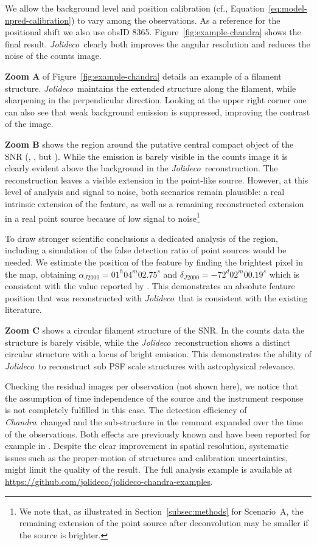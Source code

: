 \documentclass[twocolumn, linenumbers]{aastex631}
\newcommand{\chandra}{\textit{Chandra}~}
\newcommand{\jolideco}{\textit{Jolideco}~}
\begin{document}
    We allow the background level and position calibration (cf., Equation~\ref{eq:model-npred-calibration}) to vary among the observations. As a reference for the positional shift we also use obsID 8365. Figure~\ref{fig:example-chandra} shows the final result. \jolideco clearly both improves the angular resolution and reduces the noise of the counts image. 
    
    \textbf{Zoom A} of Figure~\ref{fig:example-chandra} details an example of a filament structure. \jolideco maintains the extended structure along the filament, while sharpening in the perpendicular direction. Looking at the upper right corner one can also see that weak background emission is suppressed, improving the contrast of the image.
    
    \textbf{Zoom B} shows the region around the putative central compact object of the SNR (\cite{Vogt2018}, \cite{Hebbar2020}, but \cite{Long2020}). While the emission is barely visible in the counts image it is clearly evident above the background in the \jolideco reconstruction. The reconstruction leaves a visible extension in the point-like source. However, at this level of analysis and signal to noise, both scenarios remain plausible: a real intrinsic extension of the feature, as well as a remaining reconstructed extension in a real point source because of low signal to noise\footnote{We note that, as illustrated in Section~\ref{subsec:methods} for Scenario~A, the remaining extension of the point source after deconvolution may be smaller if the source is brighter.} 
    
    To draw stronger scientific conclusions a dedicated analysis of the region, including a simulation of the false detection ratio of point sources would be needed. We estimate the position of the feature by finding the brightest pixel in the map, obtaining $\alpha_{J2000}=01^h04^m02.75^s$ and $\delta_{J2000}=-72^d02^m00.19^s$ which is consistent with the value reported by \cite{Long2020}. This demonstrates an absolute feature position that was reconstructed with \jolideco that is consistent with the existing literature.
    
    \textbf{Zoom C} shows a circular filament structure of the SNR. In the counts data the structure is barely visible, while the \jolideco reconstruction shows a distinct circular structure with a locus of bright emission. This demonstrates the ability of \jolideco to reconstruct sub PSF scale structures with astrophysical relevance.

    Checking the residual images per observation (not shown here), we notice that the assumption of time independence of the source and the instrument response is not completely fulfilled in this case. The detection efficiency of \chandra changed and the sub-structure in the remnant expanded over the time of the observations. Both effects are previously known and have been reported for example in \cite{Xi2019}. Despite the clear improvement in spatial resolution, systematic issues such as the proper-motion of structures and calibration uncertainties, might limit the quality of the result. The full analysis example is available at \url{https://github.com/jolideco/jolideco-chandra-examples}.
\end{document}
